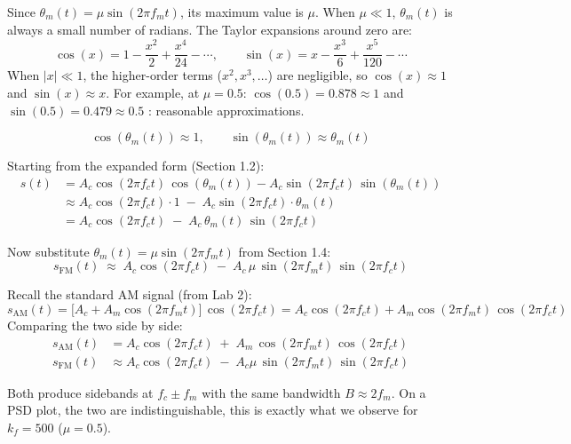 \documentclass[../../main.tex]{subfiles}
\begin{document}
\begin{IntuitionBox}
Since $\theta_m(t) = \mu\sin(2\pi f_m t)$, its maximum value is $\mu$. When $\mu \ll 1$, $\theta_m(t)$ is always a small number of radians. The Taylor expansions around zero are:
\[
  \cos(x) = 1 - \frac{x^2}{2} + \frac{x^4}{24} - \cdots, \qquad
  \sin(x) = x - \frac{x^3}{6} + \frac{x^5}{120} - \cdots
\]
When $|x| \ll 1$, the higher-order terms ($x^2, x^3, \ldots$) are negligible, so $\cos(x) \approx 1$ and $\sin(x) \approx x$. For example, at $\mu = 0.5$: $\cos(0.5) = 0.878 \approx 1$ and $\sin(0.5) = 0.479 \approx 0.5$ : reasonable approximations.
\end{IntuitionBox}
\[
  \cos(\theta_m(t)) \approx 1, \qquad \sin(\theta_m(t)) \approx \theta_m(t)
\]

Starting from the expanded form (Section 1.2):
\begin{align}
  s(t) &= A_c \cos(2\pi f_c t)\,\cos(\theta_m(t)) - A_c \sin(2\pi f_c t)\,\sin(\theta_m(t)) \nonumber\\[6pt]
       &\approx A_c \cos(2\pi f_c t) \cdot 1 \;-\; A_c \sin(2\pi f_c t) \cdot \theta_m(t) \nonumber\\[6pt]
       &= A_c \cos(2\pi f_c t) \;-\; A_c\,\theta_m(t)\,\sin(2\pi f_c t)
\end{align}

Now substitute $\theta_m(t) = \mu\sin(2\pi f_m t)$ from Section 1.4:
\[
\boxed{
  s_\text{FM}(t) \;\approx\; A_c \cos(2\pi f_c t)
  \;-\; A_c\,\mu\,\sin(2\pi f_m t)\,\sin(2\pi f_c t)
}
\]

\vspace{0.5em}

\begin{IntuitionBox}
Recall the standard AM signal (from Lab 2):
\[
  s_\text{AM}(t) = \big[A_c + A_m\cos(2\pi f_m t)\big]\,\cos(2\pi f_c t)
  = A_c\cos(2\pi f_c t) + A_m\cos(2\pi f_m t)\,\cos(2\pi f_c t)
\]
Comparing the two side by side:
\begin{align}
  s_\text{AM}(t) &= A_c\cos(2\pi f_c t) \;+\; A_m\,\cos(2\pi f_m t)\,\cos(2\pi f_c t) \nonumber\\[6pt]
  s_\text{FM}(t) &\approx A_c\cos(2\pi f_c t) \;-\; A_c\mu\,\sin(2\pi f_m t)\,\sin(2\pi f_c t) \nonumber
\end{align}

Both produce sidebands at $f_c \pm f_m$ with the same bandwidth $B \approx 2f_m$. On a PSD plot, the two are indistinguishable, this is exactly what we observe for $k_f = 500$ ($\mu = 0.5$).
\end{IntuitionBox}
\vspace{0.5em}
\end{document}
